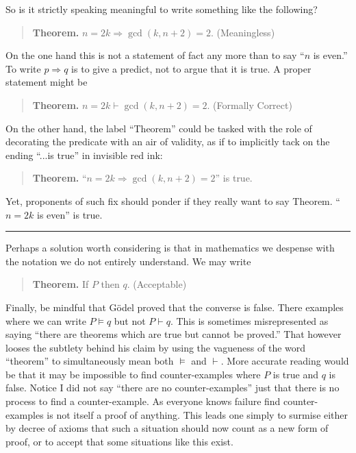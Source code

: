 \begin{remark}
    So is it strictly speaking meaningful to write something like the 
    following? 
    \begin{quote}
        \textbf{Theorem.} $n=2k\Rightarrow \gcd(k,n+2)=2$.
        \hfill{\color{BrickRed} (Meaningless)}
    \end{quote}
    On the one hand this is not a statement of fact any more than 
    to say ``$n$ is even.''  To write $p\Rightarrow q$ is to give 
    a predict, not to argue that it is true.  A proper statement 
    might be 
    \begin{quote}
        \textbf{Theorem.} $n=2k\vdash \gcd(k,n+2)=2$.
        \hfill{\color{BrickRed} (Formally Correct)}
    \end{quote}

    On the other hand, the label ``Theorem'' could be tasked with the 
    role of decorating the predicate with an air of validity, as if 
    to implicitly tack on the ending ``...is true'' in invisible red ink:
    \begin{quote}
        \textbf{Theorem.} ``$n=2k\Rightarrow \gcd(k,n+2)=2$'' {\color{BrickRed} is true.}
    \end{quote}
    Yet, proponents of such fix should ponder if they really want to say
    Theorem. ``$n=2k$ is even'' is true.

    \noindent\rule{\textwidth}{1pt}
    Perhaps a solution worth considering is that in mathematics we 
    despense with the notation we do not entirely understand.  We may write 
    \begin{quote}
        \textbf{Theorem.} If $P$  then $q$.
        \hfill{\color{BrickRed} (Acceptable)}
    \end{quote}
\end{remark}
Finally, be mindful that G\"odel proved that the converse is false.  There
examples where we can write $P\vDash q$ but not $P\vdash q$.   This is sometimes
misrepresented as saying ``there are theorems which are true but cannot be
proved.'' That however looses the subtlety behind his claim by using the
vagueness of the word ``theorem'' to simultaneously mean both $\vDash$ and
$\vdash$.  More accurate reading would be that it may be impossible to find
counter-examples where $P$ is true and $q$ is false. Notice I did not say
``there are no counter-examples'' just that there is no process to find a
counter-example.  As everyone knows failure find counter-examples is not itself
a proof of anything. This leads one simply to surmise either by decree of axioms 
that such a situation should now count as a new form of proof, or to accept that 
some situations like this exist.

